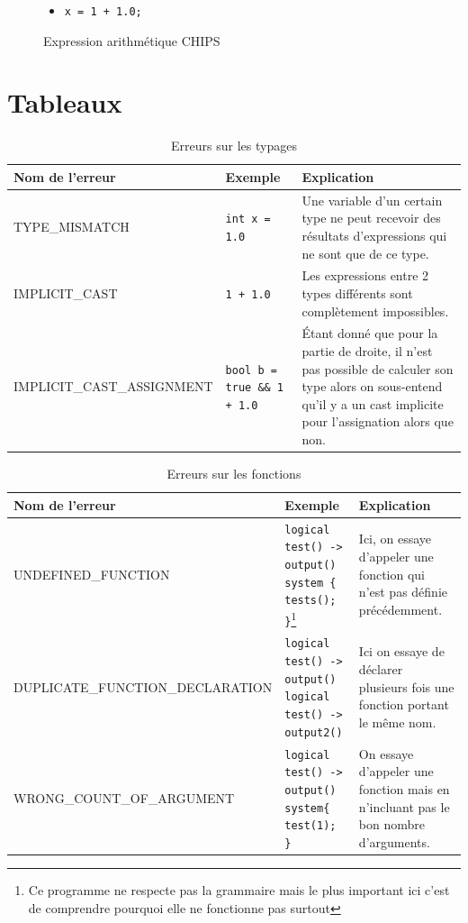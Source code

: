 \documentclass[a4paper, 11pt]{article}
\newcommand{\prog}[1]{\texttt{#1}}
\begin{document}
\begin{appendix}
\begin{figure}
    \begin{itemize}
        \centering
        \item[] \prog{x = 1 + 1.0;}
    \end{itemize}
    \caption{Expression arithmétique CHIPS}
    \label{fig:expression_arithmetique}
\end{figure}

\section{Tableaux}

\begin{table}
    \centering
    \begin{tabular}{|l|l|p{5cm}|}
        \hline
        Nom de l'erreur & Exemple & Explication \\
        \hline
        TYPE\_MISMATCH & \prog{int x = 1.0} & Une variable d'un certain type ne peut recevoir des résultats d'expressions qui ne sont que de ce type.  \\
        \hline
        IMPLICIT\_CAST & \prog{1 + 1.0} & Les expressions entre 2 types différents sont complètement impossibles. \\
        \hline
        IMPLICIT\_CAST\_ASSIGNMENT & \prog{bool b = true \&\& 1 + 1.0} & Étant donné que pour la partie de droite, il n'est pas possible de calculer son type alors on sous-entend qu'il y a un cast implicite pour l'assignation alors que non. \\
        \hline
    \end{tabular}
    \caption{Erreurs sur les typages}
    \label{tab:erreur_typage}
\end{table}

\begin{table}
    \centering
    \begin{tabular}{|p{8cm}|l|p{3.5cm}|}
        \hline
        Nom de l'erreur & Exemple & Explication \\
        \hline
        UNDEFINED\_FUNCTION & \makecell{\prog{logical test() -> output()} \\ \prog{system \{ tests(); \}}}\footnote{Ce programme ne respecte pas la grammaire mais le plus important ici c'est de comprendre pourquoi elle ne fonctionne pas surtout} & Ici, on essaye d'appeler une fonction qui n'est pas définie précédemment. \\
        \hline
        DUPLICATE\_FUNCTION\_DECLARATION & \makecell{\prog{logical test() -> output()} \\ \prog{logical test() -> output2()}} & Ici on essaye de déclarer plusieurs fois une fonction portant le même nom. \\
        \hline
        WRONG\_COUNT\_OF\_ARGUMENT & \makecell{\prog{logical test() -> output()} \\ \prog{system\{ test(1); \}}} & On essaye d'appeler une fonction mais en n'incluant pas le bon nombre d'arguments. \\
        \hline
    \end{tabular}
    \caption{Erreurs sur les fonctions}
    \label{tab:erreur_fonction}
\end{table}


\end{appendix}
\end{document}
